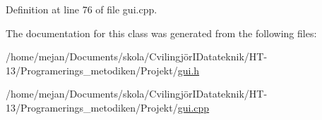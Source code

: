 Definition at line 76 of file gui.\-cpp.



The documentation for this class was generated from the following files\-:\begin{DoxyCompactItemize}
\item 
/home/mejan/\-Documents/skola/\-Cvilingjör\-I\-Datateknik/\-H\-T-\/13/\-Programerings\-\_\-metodiken/\-Projekt/\hyperlink{gui_8h}{gui.\-h}\item 
/home/mejan/\-Documents/skola/\-Cvilingjör\-I\-Datateknik/\-H\-T-\/13/\-Programerings\-\_\-metodiken/\-Projekt/\hyperlink{gui_8cpp}{gui.\-cpp}\end{DoxyCompactItemize}
